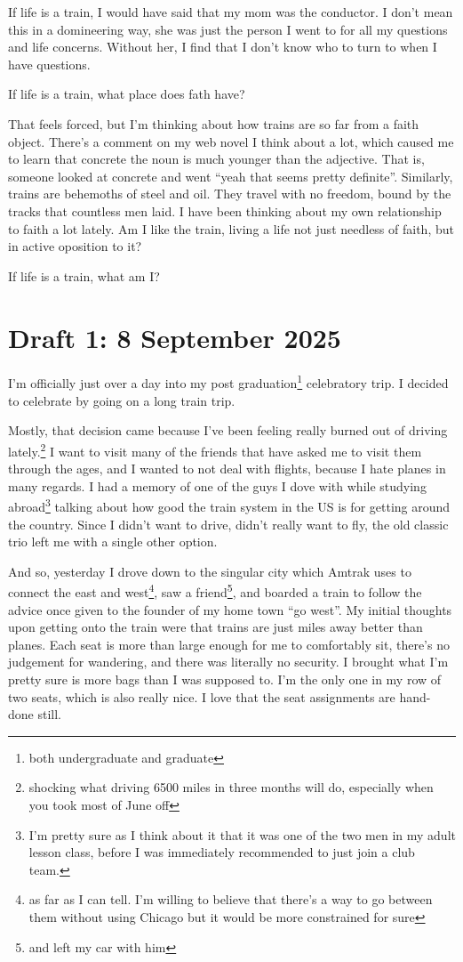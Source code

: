 \documentclass[12pt]{article}
\newcommand{\say}[1]{``#1''}
\renewcommand{\,}{\textsuperscript{,}}
\begin{document}
If life is a train, I would have said that my mom was the conductor.
I don't mean this in a domineering way, she was just the person I went to for all my questions and life concerns.
Without her, I find that I don't know who to turn to when I have questions.

If life is a train, what place does fath have?

That feels forced, but I'm thinking about how trains are so far from a faith object.
There's a comment on my web novel I think about a lot, which caused me to learn that concrete the noun is much younger than the adjective.
That is, someone looked at concrete and went \say{yeah that seems pretty definite}.
Similarly, trains are behemoths of steel and oil.
They travel with no freedom, bound by the tracks that countless men laid.
I have been thinking about my own relationship to faith a lot lately.
Am I like the train, living a life not just needless of faith, but in active oposition to it?

If life is a train, what am I?
\section{Draft 1: 8 September 2025}
I'm officially just over a day into my post graduation\footnote{both undergraduate and graduate} celebratory trip.
I decided to celebrate by going on a long train trip.

Mostly, that decision came because I've been feeling really burned out of driving lately.\footnote{shocking what driving 6500 miles in three months will do, especially when you took most of June off}
I want to visit many of the friends that have asked me to visit them through the ages, and I wanted to not deal with flights, because I hate planes in many regards.
I had a memory of one of the guys I dove with while studying abroad\footnote{I'm pretty sure as I think about it that it was one of the two men in my adult lesson class, before I was immediately recommended to just join a club team.} talking about how good the train system in the US is for getting around the country.
Since I didn't want to drive, didn't really want to fly, the old classic trio left me with a single other option.

And so, yesterday I drove down to the singular city which Amtrak uses to connect the east and west\footnote{as far as I can tell. I'm willing to believe that there's a way to go between them without using Chicago but it would be more constrained for sure}, saw a friend\footnote{and left my car with him}, and boarded a train to follow the advice once given to the founder of my home town \say{go west}.
My initial thoughts upon getting onto the train were that trains are just miles away better than planes.
Each seat is more than large enough for me to comfortably sit, there's no judgement for wandering, and there was literally no security.
I brought what I'm pretty sure is more bags than I was supposed to.
I'm the only one in my row of two seats, which is also really nice.
I love that the seat assignments are hand-done still.
\end{document}

